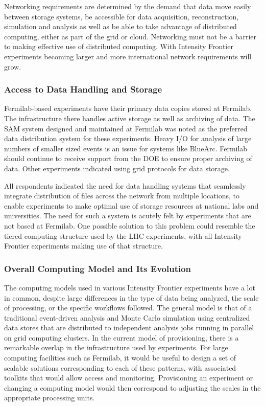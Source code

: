 Networking requirements are determined by the demand that data move easily between storage systems,
be accessible for data acquisition, reconstruction, simulation and analysis
as well as be able to take advantage of distributed computing,
either as part of the grid or cloud.  Networking must not be a barrier to
making effective use of distributed computing. With Intensity Frontier experiments becoming
larger and more international network requirements will grow.

\subsubsection{Access to Data Handling and Storage}
Fermilab-based experiments have
their primary data copies stored at Fermilab.  The infrastructure there
handles active storage as well as archiving of data.  The SAM system designed
and maintained at Fermilab was noted as the preferred data distribution system
for these experiments. Heavy I/O for analysis of large numbers of smaller
sized events is an issue for systems like BlueArc. Fermilab should continue to
receive support from the DOE to ensure proper archiving of data. Other
experiments indicated using grid protocols for data storage.

All respondents indicated the need for data handling systems that seamlessly
integrate distribution of files across the network from multiple locations, to
enable experiments to make optimal use of storage resources at national labs
and universities.  The need for such a system is acutely felt by experiments
that are not based at Fermilab.  One possible solution to this problem could
resemble the tiered computing structure used by the LHC experiments, with all
Intensity Frontier experiments making use of that structure.


\subsubsection{Overall Computing Model and Its Evolution}
The computing models used in various 
Intensity Frontier experiments have a lot in common, despite large differences in
the type of data being analyzed, the scale of processing, or the specific
workflows followed.   The general model is that of a traditional event-driven
analysis and Monte Carlo simulation using centralized data stores that are
distributed to independent analysis jobs running in parallel on grid computing
clusters.  In the current model of provisioning, there is a remarkable overlap
in the infrastructure used by experiments. For large computing facilities such
as Fermilab, it would be useful to design a set of scalable solutions
corresponding to each of these patterns, with associated toolkits that would
allow access and monitoring. Provisioning an experiment or changing a
computing model would then correspond to adjusting the scales in the
appropriate processing units.

